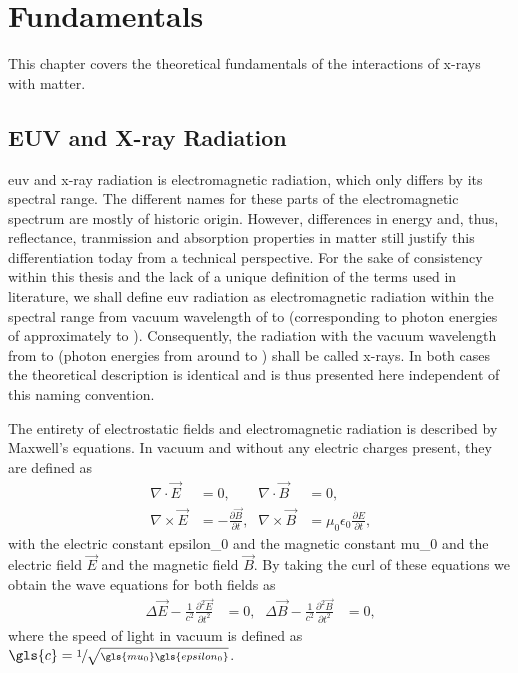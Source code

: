\chapter{Fundamentals}
This chapter covers the theoretical fundamentals of the interactions of x-rays with matter.
\section{EUV and X-ray Radiation}
\Gls{euv} and x-ray radiation is electromagnetic radiation, which only differs by its spectral range. The different names for these parts of the electromagnetic spectrum are mostly of historic origin. However, differences in energy and, thus, reflectance, tranmission and absorption properties in matter still justify this differentiation today from a technical perspective. For the sake of consistency within this thesis and the lack of a unique definition of the terms used in literature, we shall define \gls{euv} radiation as electromagnetic radiation within the spectral range from vacuum wavelength of  to  (corresponding to photon energies of approximately  to ). Consequently, the radiation with the vacuum wavelength from  to  (photon energies from around  to ) shall be called x-rays. In both cases the theoretical description is identical and is thus presented here independent of this naming convention.

The entirety of electrostatic fields and electromagnetic radiation is described by Maxwell's equations. In vacuum and without any electric charges present, they are defined as
\begin{align*}
\nabla \cdotp \vec{E} &=0 \text{,} & \nabla \cdotp \vec{B} &=0 \text{,}\\
\nabla \times \vec{E} & = -\frac{\partial \vec{B}}{\partial t}\text{,} & \nabla \times \vec{B} &= \mu_0 \epsilon_0 \frac{\partial E}{\partial t} \text{,}
\end{align*}
with the electric constant \gls{epsilon_0} and the magnetic constant \gls{mu_0} and the electric field $\vec{E}$ and the magnetic field $\vec{B}$. By taking the curl of these equations we obtain the wave equations for both fields as
\begin{align}
\Delta \vec{E} - \frac{1}{c^2} \frac{\partial^2 \vec{E}}{\partial t^2} &= 0\text{,}& \Delta \vec{B} - \frac{1}{c^2} \frac{\partial^2 \vec{B}}{\partial t^2} &= 0\text{,} \label{ch_theo:eqn_wave_equation_vacuum}
\end{align}
where the speed of light in vacuum is defined as $\gls{c} = \sfrac{1}{\sqrt{\gls{mu_0}\gls{epsilon_0}}}$.

